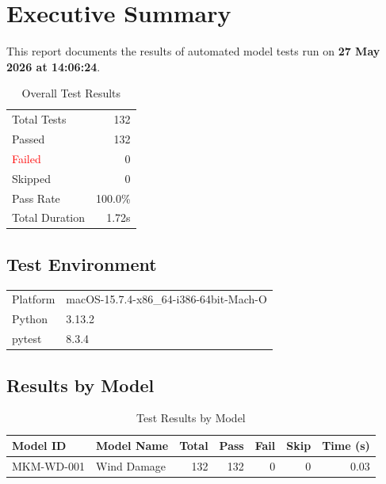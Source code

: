 \documentclass[11pt,a4paper]{article}
\begin{document}
\mkmtitlepage
\mkmlegalpage
\tableofcontents
\clearpage

\section{Executive Summary}

This report documents the results of automated model tests run on \textbf{27 May 2026 at 14:06:24}.

\begin{table}[H]
    \centering
    \caption{Overall Test Results}
    \label{tab:overall_summary}
    \begin{tabular}{lr}
        \toprule
        Total Tests & 132 \\
        \textcolor{green!60!black}{Passed} & 132 \\
        \textcolor{red}{Failed} & 0 \\
        Skipped & 0 \\
        Pass Rate & 100.0\% \\
        Total Duration & 1.72s \\
        \bottomrule
    \end{tabular}
\end{table}

\subsection{Test Environment}

\begin{table}[H]
    \centering
    \begin{tabular}{ll}
        \toprule
        Platform & macOS-15.7.4-x86\_64-i386-64bit-Mach-O \\
        Python & 3.13.2 \\
        pytest & 8.3.4 \\
        \bottomrule
    \end{tabular}
\end{table}

\subsection{Results by Model}

\begin{table}[H]
    \centering
    \caption{Test Results by Model}
    \label{tab:results_by_model}
    \begin{tabular}{llrrrrr}
        \toprule
        \textbf{Model ID} & \textbf{Model Name} & \textbf{Total} & \textbf{Pass} & \textbf{Fail} & \textbf{Skip} & \textbf{Time (s)} \\
        \midrule
        MKM-WD-001 & Wind Damage & 132 & 132 & 0 & 0 & 0.03 \\
        \bottomrule
    \end{tabular}
\end{table}
\clearpage
\end{document}
